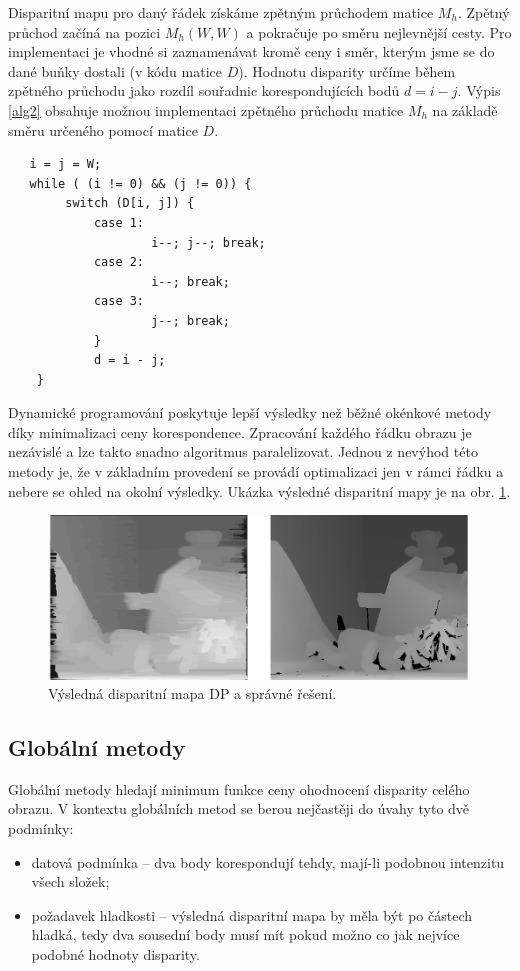 Disparitní mapu pro daný řádek získáme zpětným průchodem matice $M_{h}$. Zpětný průchod začíná na pozici $M_{h}(W,W)$ a pokračuje po směru nejlevnější cesty. Pro implementaci je vhodné si zaznamenávat kromě ceny i směr, kterým jsme se do dané buňky dostali (v kódu matice $D$). Hodnotu disparity určíme během zpětného průchodu jako rozdíl souřadnic korespondujících bodů $d = i - j$. Výpis \ref{alg2} obsahuje možnou implementaci zpětného průchodu matice $M_{h}$ na základě směru určeného pomocí matice $D$.

\begin{lstlisting}
   i = j = W;
   while ( (i != 0) && (j != 0)) {
        switch (D[i, j]) {
            case 1:     
                    i--; j--; break;
            case 2:
                    i--; break;
            case 3:
                    j--; break;
            }
            d = i - j;
    }
\end{lstlisting}

Dynamické programování poskytuje lepší výsledky než běžné okénkové metody díky minimalizaci ceny korespondence. Zpracování každého řádku obrazu je nezávislé a lze takto snadno algoritmus paralelizovat. Jednou z nevýhod této metody je, že v základním provedení se provádí optimalizaci jen v rámci řádku a nebere se ohled na okolní výsledky. Ukázka výsledné disparitní mapy je na obr. \ref{img:stereo_demo_dp}.

\begin{figure}[htb]
    \centering
    \includegraphics[width=5in]{11_stereo/images/stereo_demo_dp}
    \caption{Výsledná disparitní mapa DP a správné řešení.}
    \label{img:stereo_demo_dp}
\end{figure}

\subsection{Globální metody}
Globální metody hledají minimum funkce ceny ohodnocení disparity celého obrazu. V kontextu globálních metod se berou nejčastěji do úvahy tyto dvě podmínky: 
\begin{itemize}
	\item datová podmínka -- dva body korespondují tehdy, mají-li podobnou intenzitu všech složek; 
	\item požadavek hladkosti -- výsledná disparitní mapa by měla být po částech hladká, tedy dva sousední body musí mít pokud možno co jak nejvíce podobné hodnoty disparity.
\end{itemize}


